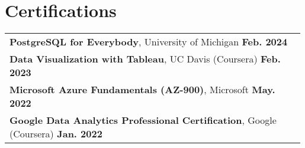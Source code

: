 \documentclass[letterpaper,11pt]{article}
\begin{document}
\section{Certifications}
\begin{tabular}{p{0.99\linewidth}}
    \hspace{0.15in}\textbf{PostgreSQL for Everybody}, University of Michigan
        \hfill \textbf{Feb. 2024} \\
    \hspace{0.15in}\textbf{Data Visualization with Tableau}, UC Davis (Coursera)
        \hfill \textbf{Feb. 2023} \\
    \hspace{0.15in}\textbf{Microsoft Azure Fundamentals (AZ-900)}, Microsoft
        \hfill \textbf{May. 2022} \\
    \hspace{0.15in}\textbf{Google Data Analytics Professional Certification}, Google (Coursera)
        \hfill \textbf{Jan. 2022} \\
\end{tabular}
\end{document}
